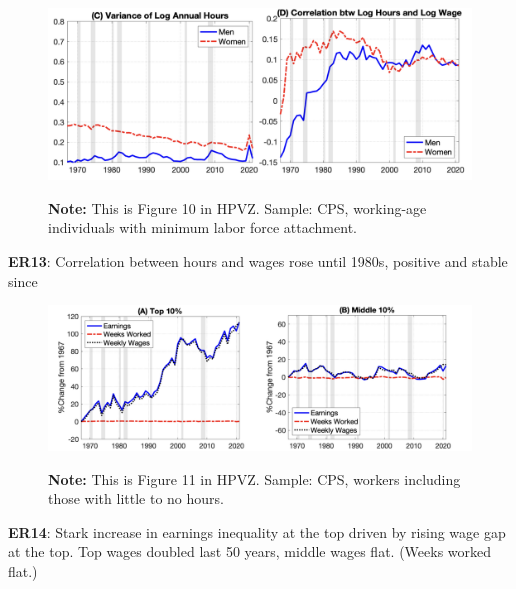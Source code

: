\documentclass[11pt, aspectratio=169]{beamer}
\begin{document}
\begin{frame}{}
	\begin{figure}
		\includegraphics[scale=0.4]{./figures/inequality_earnings_3}
	\vspace*{-2mm}
	\begin{flushleft}
		{\scriptsize \hspace{6mm} \textbf{Note:} This is Figure 10 in HPVZ. Sample: CPS, working-age individuals with minimum labor force attachment.}
	\end{flushleft}	
	\end{figure}

	\vspace{0mm}
	{\color{blue}\textbf{ER13}}: Correlation between hours and wages rose until 1980s, positive and stable since 
\end{frame}


\begin{frame}{}
	\begin{figure}
		\includegraphics[scale=0.4]{./figures/inequality_earnings_4}
	\vspace*{-2mm}
	\begin{flushleft}
		{\scriptsize \hspace{6mm} \textbf{Note:} This is Figure 11 in HPVZ. Sample: CPS, workers including those with little to no hours.}
	\end{flushleft}	
	\end{figure}

	\vspace{0mm}
	{\color{blue}\textbf{ER14}}: Stark increase in earnings inequality at the top driven by rising wage gap at the top. Top wages doubled last 50 years, middle wages flat. (Weeks worked flat.)
\end{frame}
\end{document}
